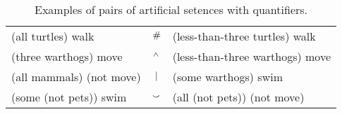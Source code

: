
\begin{table*}[htp]
  \centering\small
  \begin{tabular}{lcl}
    \toprule
    (all turtles) walk      &    $\mathbin{\#}$  & (less-than-three turtles) walk\\
    (three warthogs) move  &        $\mathbin{^{\wedge}}$ & (less-than-three warthogs) move\\
    (all mammals) (not move) &         $\mathbin{|}$ & (some warthogs) swim\\
    (some (not pets)) swim     &     $\mathbin{\smallsmile}$  & (all (not pets)) (not move)\\
    \bottomrule
  \end{tabular}
  \caption{\label{examplesofdata}Examples of pairs of artificial setences with quantifiers.}

\end{table*}

